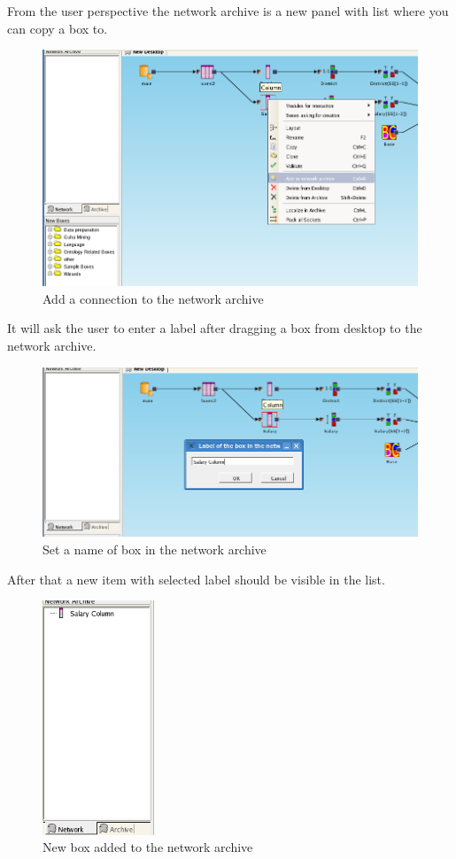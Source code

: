 \documentclass[a4paper,12pt]{book}
\begin{document}
From the user perspective the network archive is a new panel with list where you can copy a box to.
\begin{figure}
	\includegraphics[width=13.72cm]{add_to_network_archive}
	\caption{Add a connection to the network archive}
\end{figure}
It will ask the user to enter a label after dragging a box from desktop to the network archive.
\begin{figure}
	\includegraphics[width=13.72cm]{set_name_of_box_in_network_archive}
	\caption{Set a name of box in the network archive}
\end{figure}
After that a new item with selected label should be visible in the list.
\begin{figure}
	\includegraphics[height=7cm]{network_archive_box_added}
	\caption{New box added to the network archive}
\end{figure}
\end{document}
